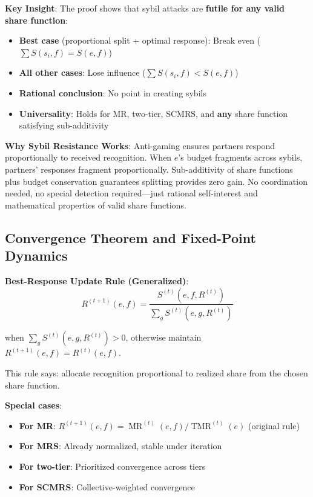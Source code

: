 \documentclass[11pt,a4paper]{article}
\theoremstyle{definition}
\theoremstyle{remark}
\DeclareMathOperator{\TMR}{TMR}
\DeclareMathOperator{\MR}{MR}
\begin{document}
\textbf{Key Insight}: The proof shows that sybil attacks are \textbf{futile for any valid share function}:
\begin{itemize}
\item \textbf{Best case} (proportional split + optimal response): Break even ($\sum S(s_i, f) = S(e,f)$)
\item \textbf{All other cases}: Lose influence ($\sum S(s_i, f) < S(e,f)$)
\item \textbf{Rational conclusion}: No point in creating sybils
\item \textbf{Universality}: Holds for MR, two-tier, SCMRS, and \textbf{any} share function satisfying sub-additivity
\end{itemize}

\textbf{Why Sybil Resistance Works}: Anti-gaming ensures partners respond proportionally to received recognition. When $e$'s budget fragments across sybils, partners' responses fragment proportionally. Sub-additivity of share functions plus budget conservation guarantees splitting provides zero gain. No coordination needed, no special detection required---just rational self-interest and mathematical properties of valid share functions.

\subsection{Convergence Theorem and Fixed-Point Dynamics}

\textbf{Best-Response Update Rule (Generalized)}:
\[ R^{(t+1)}(e,f) = \frac{S^{(t)}(e,f,R^{(t)})}{\sum_g S^{(t)}(e,g,R^{(t)})} \]

when $\sum_g S^{(t)}(e,g,R^{(t)}) > 0$, otherwise maintain $R^{(t+1)}(e,f) = R^{(t)}(e,f)$.

This rule says: allocate recognition proportional to realized share from the chosen share function.

\textbf{Special cases}:
\begin{itemize}
\item \textbf{For MR}: $R^{(t+1)}(e,f) = \MR^{(t)}(e,f) / \TMR^{(t)}(e)$ (original rule)
\item \textbf{For MRS}: Already normalized, stable under iteration
\item \textbf{For two-tier}: Prioritized convergence across tiers
\item \textbf{For SCMRS}: Collective-weighted convergence
\end{itemize}
\end{document}
